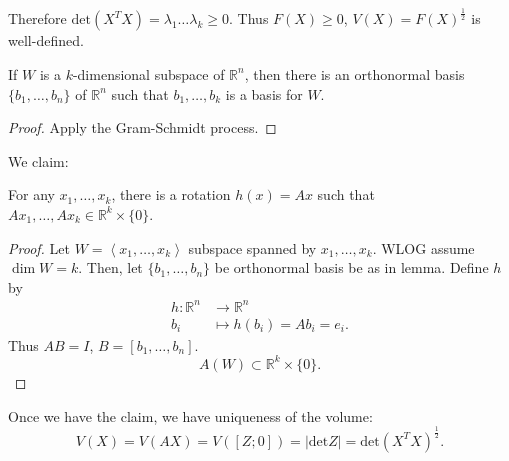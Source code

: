 Therefore 
	$\text{det}(X^T X) = \lambda_1 \ldots \lambda_k\ge 0$. Thus $F(X) \ge 0$, $V(X) = F(X)^{\frac{1}{2}}$ is well-defined. 


\begin{lemma}
	If $W$ is a $k$-dimensional subspace of $\mathbb{R}^n$, then there is an orthonormal basis $\{b_1, \ldots, b_n\} $ of $\mathbb{R}^n$ such that $b_1, \ldots, b_k$ is a basis for $W$.
\end{lemma}
\begin{proof}
	Apply the Gram-Schmidt process.
\end{proof}


We claim:
\begin{proposition}
	For any $x_1, \ldots, x_k$, there is a rotation $h(x) = Ax$ such that  $A x_1, \ldots, Ax_k \in \mathbb{R}^k \times \{0\} $.
\end{proposition}
\begin{proof}
	Let $W = \left\langle x_1, \ldots, x_k \right\rangle $ subspace spanned by $x_1, \ldots, x_k$. WLOG assume $\operatorname{dim} W = k$. Then, let $\{b_1, \ldots, b_n\} $ be orthonormal basis be as in lemma. Define $h$ by
	\begin{align*}
		h: \mathbb{R}^n &\longrightarrow \mathbb{R}^n \\
		b_i &\longmapsto h(b_i) = Ab_i = e_i 
	.\end{align*}
	Thus $AB = I$, $B = [b_1, \ldots, b_n] $.
	\[
		A(W) \subset \mathbb{R}^k \times \{0\} 
	.\] 
\end{proof}

Once we have the claim, we have uniqueness of the volume:
\[
	V(X) = V(AX) = V([Z;0]) = |\text{det}Z| = \text{det}(X^T X)^{\frac{1}{2}}
.\] 


